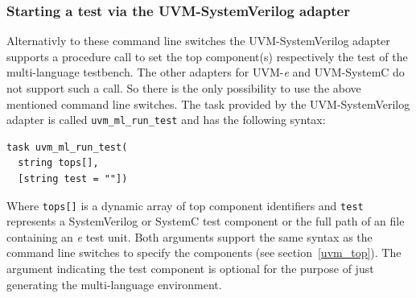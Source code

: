 \subsubsection{Starting a test via the UVM-SystemVerilog adapter}

Alternativly to these command line switches the UVM-SystemVerilog adapter supports a procedure call to set the top
component(s) respectively the test of the multi-language testbench. The other adapters for UVM-\textit{e} and
UVM-SystemC do not support such a call. So there is the only possibility to use the above mentioned command line
switches. The task provided by the UVM-SystemVerilog adapter is called \lstinline$uvm_ml_run_test$ and has the following
syntax:
\medskip
{}
\begin{lstlisting}
task uvm_ml_run_test(
  string tops[],
  [string test = ""])
\end{lstlisting} 
\medskip
Where \lstinline$tops[]$ is a dynamic array of top component identifiers and \lstinline$test$ represents a
SystemVerilog or SystemC test component or the full path of an file containing an \textit{e} test unit. Both arguments
support the same syntax as the command line switches to specify the components (see section~\ref{uvm_top}). The argument
indicating the test component is optional for the purpose of just generating the multi-language environment.
